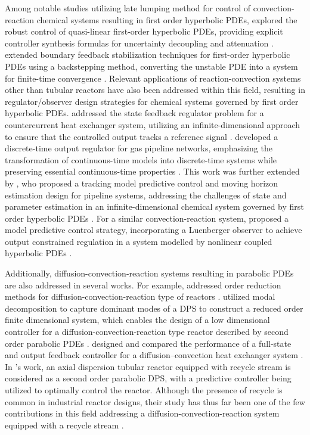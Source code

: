 Among notable studies utilizing late lumping method for control of convection-reaction chemical systems resulting in first order hyperbolic PDEs,  explored the robust control of quasi-linear first-order hyperbolic PDEs, providing explicit controller synthesis formulas for uncertainty decoupling and attenuation \autocite{christofides1998robust}.  extended boundary feedback stabilization techniques for first-order hyperbolic PDEs using a backstepping method, converting the unstable PDE into a system for finite-time convergence \autocite{krstic2008backstepping}. Relevant applications of reaction-convection systems other than tubular reactors have also been addressed within this field, resulting in regulator/observer design strategies for chemical systems governed by first order hyperbolic PDEs.  addressed the state feedback regulator problem for a countercurrent heat exchanger system, utilizing an infinite-dimensional approach to ensure that the controlled output tracks a reference signal \autocite{xu2016state}.  developed a discrete-time output regulator for gas pipeline networks, emphasizing the transformation of continuous-time models into discrete-time systems while preserving essential continuous-time properties \autocite{xie2021discrete}. This work was further extended by , who proposed a tracking model predictive control and moving horizon estimation design for pipeline systems, addressing the challenges of state and parameter estimation in an infinite-dimensional chemical system governed by first order hyperbolic PDEs \autocite{zhang2023tracking}. For a similar convection-reaction system,  proposed a model predictive control strategy, incorporating a Luenberger observer to achieve output constrained regulation in a system modelled by nonlinear coupled hyperbolic PDEs \autocite{zhang2022dynamic}. 

Additionally, diffusion-convection-reaction systems resulting in parabolic PDEs are also addressed in several works. For example,  addressed order reduction methods for diffusion-convection-reaction type of reactors \autocite{Christofides2012book}.  utilized modal decomposition to capture dominant modes of a DPS to construct a reduced order finite dimensional system, which enables the design of a low dimensional controller for a diffusion-convection-reaction type reactor described by second order parabolic PDEs \autocite{dubljevic2006predictive2}.  designed and compared the performance of a full-state and output feedback controller for a diffusion--convection heat exchanger system \autocite{ozorio2019heat}. In 's work, an axial dispersion tubular reactor equipped with recycle stream is considered as a second order parabolic DPS, with a predictive controller being utilized to optimally control the reactor.  Although the presence of recycle is common in industrial reactor designs, their study has thus far been one of the few contributions in this field addressing a diffusion-convection-reaction system equipped with a recycle stream \autocite{khatibi2021model}.

